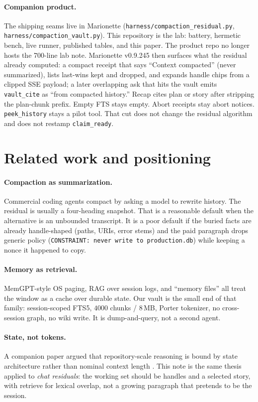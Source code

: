 \documentclass[11pt]{article}
\begin{document}
\paragraph{Companion product.}
The shipping seams live in Marionette
(\texttt{harness/compaction\_residual.py},
\texttt{harness/compaction\_vault.py}). This repository is the lab:
battery, hermetic bench, live runner, published tables, and this paper.
The product repo no longer hosts the 700-line lab note.
Marionette v0.9.245 then surfaces what the residual already computed:
a compact receipt that says ``Context compacted'' (never summarized),
lists last-wins kept and dropped, and expands handle chips from a
clipped SSE payload; a later overlapping ask that hits the vault emits
\texttt{vault\_cite} as ``from compacted history.'' Recap cites plan or
story after stripping the plan-chunk prefix. Empty FTS stays empty.
Abort receipts stay abort notices. \texttt{peek\_history} stays a
pilot tool. That cut does not change the residual algorithm and does
not restamp \texttt{claim\_ready}.

\section{Related work and positioning}
\label{sec:related}

\paragraph{Compaction as summarization.}
Commercial coding agents compact by asking a model to rewrite history.
The residual is usually a four-heading snapshot. That is a reasonable
default when the alternative is an unbounded transcript. It is a poor
default if the buried facts are already handle-shaped (paths, URIs,
error stems) and the paid paragraph drops generic policy
(\texttt{CONSTRAINT: never write to production.db}) while keeping a
nonce it happened to copy.

\paragraph{Memory as retrieval.}
MemGPT-style OS paging, RAG over session logs, and ``memory files'' all
treat the window as a cache over durable state. Our vault is the small
end of that family: session-scoped FTS5, $4000$ chunks / $8$\,MB,
Porter tokenizer, no cross-session graph, no wiki write. It is
dump-and-query, not a second agent.

\paragraph{State, not tokens.}
A companion paper argued that repository-scale reasoning is bound by
state architecture rather than nominal context length
\cite{palmer2026state}. This note is the same thesis applied to
\emph{chat residuals}: the working set should be handles and a selected
story, with retrieve for lexical overlap, not a growing paragraph that
pretends to be the session.
\end{document}
